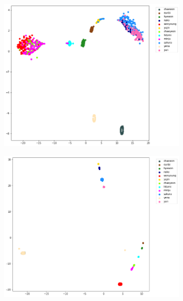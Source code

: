 \begin{enumerate}[left=0pt]
\begin{figure}[htbp]
    \vspace{2mm}
    \begin{subfigure}{0.325\textwidth}
        \centering
        \includegraphics[trim=25 22 100 0, clip, width=\textwidth]{images/faceReco/nn1-and-binary/tsne-4.png}     
    \end{subfigure}
    \hfill
    \begin{subfigure}{0.325\textwidth}
        \centering
        \includegraphics[trim=30 22 100 0, clip, width=\textwidth]{images/faceReco/nn1-and-binary/tsne-5.png}     
    \end{subfigure}

\end{figure}
\end{enumerate}

